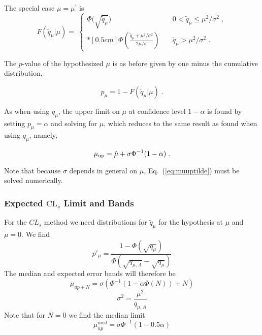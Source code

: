 The special case $\mu = \mu^{\prime}$ is
\begin{equation}
\label{eq:tildeqmmcdf} 
F(\tilde{q}_{\mu}|\mu) = 
 \: \left\{ \! \! \begin{array}{lll}
\Phi\Big( \sqrt{\tilde{q}_{\mu}} \Big)
                 & \quad 0 < \tilde{q}_{\mu} \le \mu^2/\sigma^2  
\;, \\*[0.5 cm]
\Phi \left( \frac{ \tilde{q}_{\mu} + \mu^2/\sigma^2}
{2\mu/\sigma} \right)
                 &  \quad \tilde{q}_{\mu} > \mu^2/\sigma^2 \;.
              \end{array}
       \right.
\end{equation}


The $p$-value of the hypothesized $\mu$ is as before
given by one minus the cumulative distribution,


\begin{equation}
\label{eq:pvalmutilde}
p_{\mu} = 1 - F(\tilde{q}_{\mu} | \mu) \;.
\end{equation}


As when using $q_{\mu}$, the upper limit on $\mu$ at confidence level
$1 - \alpha$ is found by setting $p_{\mu} = \alpha$ and solving for
$\mu$, which reduces to the same result as found when using $q_{\mu}$,
namely,


\begin{equation}
\label{eq:muuptilde}
\mu_{\rm up} =  \hat{\mu} + \sigma \Phi^{-1}(1 - \alpha) \;.
\end{equation}


Note that because $\sigma$ depends in general on $\mu$,
Eq.~(\ref{eq:muuptilde}) must be solved numerically.  


\subsubsection{Expected $\mathrm{CL}_s$ Limit and Bands}
For the $CL_s$ method we need distributions for $\tilde{q}_\mu$ for the hypothesis at $\mu$ and $\mu=0$.   We find
\begin{equation}
 p'_{\mu}=\frac{1-\Phi(\sqrt{q_\mu})}{\Phi(\sqrt{q_{\mu,A}}-\sqrt{q_{\mu}})}
 \end{equation}
The median and expected error bands will therefore be
\begin{equation}
   \mu_{{up}+N}=\sigma(\Phi^{-1}(1-\alpha \Phi(N))+N)
   \end{equation}
\begin{equation}
   \sigma^2=\frac{\mu^2}{q_{\mu,A}}
      \end{equation}
Note that for $N=0$ we find the median limit    
\begin{equation}
   \mu_{up}^{med}=\sigma \Phi^{-1}(1-0.5\alpha)
      \end{equation}


